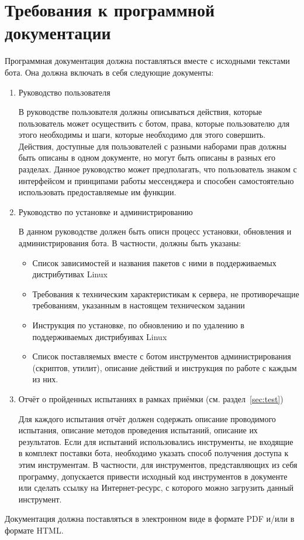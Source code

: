 \section{Требования к программной документации}
\label{sec:doc}
Программная документация должна поставляться вместе с исходными текстами бота.
Она должна включать в себя следующие документы:

\begin{enumerate}
    \item
        Руководство пользователя
        
        В руководстве пользователя должны описываться действия, которые пользователь может
        осуществить с ботом, права, которые пользователю для этого необходимы и шаги,
        которые необходимо для этого совершить. Действия, доступные для пользователей
        с разными наборами прав должны быть описаны в одном документе, но могут быть описаны
        в разных его разделах. Данное руководство может предполагать, что пользователь знаком
        с интерфейсом и принципами работы мессенджера и способен самостоятельно использовать
        предоставляемые им функции.

    \item
        Руководство по установке и администрированию

        В данном руководстве должен быть описн процесс установки, обновления и администрирования бота.
        В частности, должны быть указаны:
        \begin{itemize}
            \item
                Список зависимостей и названия пакетов с ними в поддерживаемых дистрибутивах Linux
            \item
                Требования к техническим характеристикам к сервера, не противоречащие требованиям,
                указанным в настоящем техническом задании
            \item
                Инструкция по установке, по обновлению и по удалению в поддерживаемых дистрибуивах Linux
            \item
                Список поставляемых вместе с ботом инструментов администрирования (скриптов, утилит),
                описание действий и инструкция по работе с каждым из них.
        \end{itemize}

    \item
        Отчёт о пройденных испытаниях в рамках приёмки (см. раздел~\ref{sec:test})

        Для каждого испытания отчёт должен содержать описание проводимого испытания,
        описание методов проведения испытаний, описание их результатов.
        Если для испытаний использовались инструменты, не входящие в комплект поставки
        бота, необходимо указать способ получения доступа к этим инструментам. В частности,
        для инструментов, представляющих из себя программу,
        допускается привести исходный код инструментов в документе или сделать ссылку на
        Интернет-ресурс, с которого можно загрузить данный инструмент.
\end{enumerate}

Документация должна поставляться в электронном виде в формате PDF и/или в формате HTML.
